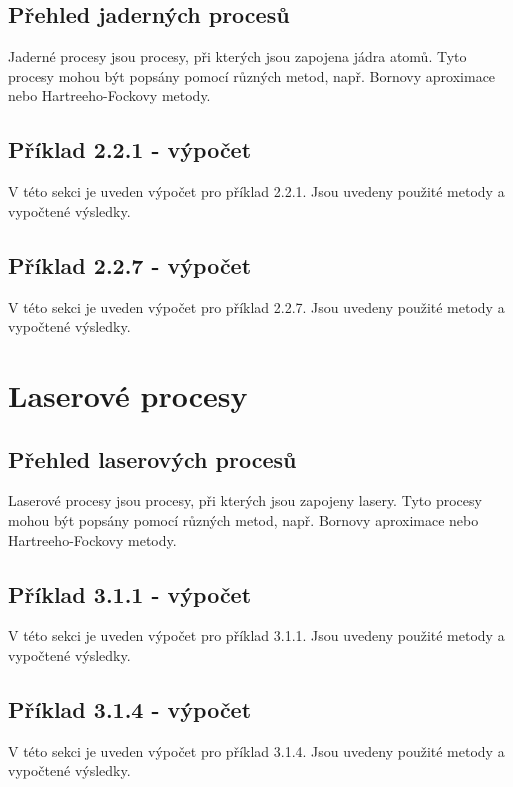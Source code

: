 \documentclass{article}
\begin{document}
\subsection{Přehled jaderných procesů}

Jaderné procesy jsou procesy, při kterých jsou zapojena jádra atomů. Tyto procesy mohou být popsány pomocí různých metod, např. Bornovy aproximace nebo Hartreeho-Fockovy metody.

\subsection{Příklad 2.2.1 - výpočet}

V této sekci je uveden výpočet pro příklad 2.2.1. Jsou uvedeny použité metody a vypočtené výsledky.

\subsection{Příklad 2.2.7 - výpočet}

V této sekci je uveden výpočet pro příklad 2.2.7. Jsou uvedeny použité metody a vypočtené výsledky.

\section{Laserové procesy}

\subsection{Přehled laserových procesů}

Laserové procesy jsou procesy, při kterých jsou zapojeny lasery. Tyto procesy mohou být popsány pomocí různých metod, např. Bornovy aproximace nebo Hartreeho-Fockovy metody.

\subsection{Příklad 3.1.1 - výpočet}

V této sekci je uveden výpočet pro příklad 3.1.1. Jsou uvedeny použité metody a vypočtené výsledky.

\subsection{Příklad 3.1.4 - výpočet}

V této sekci je uveden výpočet pro příklad 3.1.4. Jsou uvedeny použité metody a vypočtené výsledky.
\end{document}
